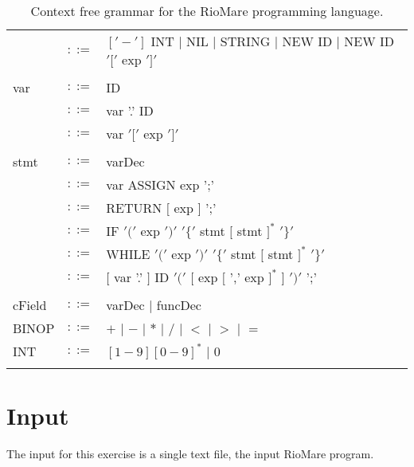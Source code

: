 \documentclass{article}
\begin{document}
\begin{table}[h]
\begin{tabular}{ l c l }
         & $::=$ & $['-']$ INT $|$ NIL $|$ STRING $|$ NEW ID $|$ NEW ID $'['$ exp $']'$ \\
\\
var      & $::=$ & ID                  \\
         & $::=$ & var '.' ID          \\
         & $::=$ & var $'['$ exp $']'$ \\
\\  
stmt     & $::=$ & varDec                                                             \\
         & $::=$ & var ASSIGN exp ';'                                                 \\
         & $::=$ & RETURN $[$ exp $]$ ';'                                             \\
         & $::=$ & IF $'('$ exp $')'$ $'\{'$ stmt $[$ stmt $]^{*}$ $'\}'$             \\
         & $::=$ & WHILE $'('$ exp $')'$ $'\{'$ stmt $[$ stmt $]^{*}$ $'\}'$          \\
         & $::=$ & $[$ var '.' $]$ ID $'('$ $[$ exp $[$ ',' exp $]^{*}$ $]$ $')'$ ';' \\
\\
cField   & $::=$ & varDec $|$ funcDec \\
BINOP    & $::=$ & $+$ $|$ $-$ $|$ $*$ $|$ $/$ $|$ $<$ $|$ $>$ $|$ $=$ \\
INT      & $::=$ & $[1-9][0-9]^{*}$ $|$ $0$                            \\
\\
\end{tabular}
\caption{
Context free grammar for the RioMare programming language.
\label{Table_CFG_Of_RioMare}}
\end{table}

\section{Input}
The input for this exercise is a single text file, the input RioMare program.
\end{document}
